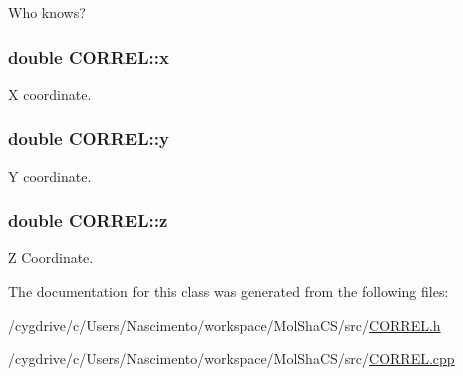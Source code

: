 Who knows? 

\hypertarget{classCORREL_a8bfe969d5de8f1138ab78b96c81efe68}{
\subsubsection[{x}]{\setlength{\rightskip}{0pt plus 5cm}double {\bf CORREL::x}}}
\label{classCORREL_a8bfe969d5de8f1138ab78b96c81efe68}


X coordinate. 

\hypertarget{classCORREL_a7b95f3b9f6b49a0f30803573d28b08d2}{
\subsubsection[{y}]{\setlength{\rightskip}{0pt plus 5cm}double {\bf CORREL::y}}}
\label{classCORREL_a7b95f3b9f6b49a0f30803573d28b08d2}


Y coordinate. 

\hypertarget{classCORREL_a733e2083e37dc8cd372b71f7d04bd645}{
\subsubsection[{z}]{\setlength{\rightskip}{0pt plus 5cm}double {\bf CORREL::z}}}
\label{classCORREL_a733e2083e37dc8cd372b71f7d04bd645}


Z Coordinate. 



The documentation for this class was generated from the following files:\begin{DoxyCompactItemize}
\item 
/cygdrive/c/Users/Nascimento/workspace/MolShaCS/src/\hyperlink{CORREL_8h}{CORREL.h}\item 
/cygdrive/c/Users/Nascimento/workspace/MolShaCS/src/\hyperlink{CORREL_8cpp}{CORREL.cpp}\end{DoxyCompactItemize}
